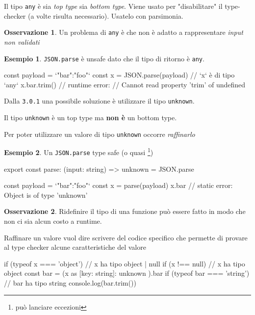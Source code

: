 \documentclass[12pt]{article}
\theoremstyle{definition}
\newtheorem{example}{Esempio}[subsection]
\newtheorem{observation}{Osservazione}[subsection]
\newenvironment{code}
  {\vspace{0.5cm} \VerbatimEnvironment\begin{typescriptcode}}
  {\end{typescriptcode} \vspace{0.2cm}}
\begin{document}
Il tipo \texttt{any} è sia \emph{top type} sia \emph{bottom type}.
Viene usato per "disabilitare" il type-checker (a volte risulta necessario).
Usatelo con parsimonia.

\begin{observation}
Un problema di \texttt{any} è che non è adatto a rappresentare \emph{input non validati}
\end{observation}

\begin{example}
\texttt{JSON.parse} è unsafe dato che il tipo di ritorno è \texttt{any}.

\begin{code}
const payload = `{"bar":"foo"}`
const x = JSON.parse(payload)
// `x` è di tipo `any`
x.bar.trim() // runtime error:
// Cannot read property 'trim' of undefined
\end{code}
\end{example}

Dalla \texttt{3.0.1} una possibile soluzione è utilizzare il tipo \texttt{unknown}.

Il tipo \texttt{unknown} è un top type ma \textbf{non è} un bottom type.

Per poter utilizzare un valore di tipo \texttt{unknown} occorre \emph{raffinarlo}

\begin{example}
Un \texttt{JSON.parse} type safe (o quasi \footnote{può lanciare eccezioni})

\begin{code}
export const parse: (input: string) => unknown = JSON.parse

const payload = `{"bar":"foo"}`
const x = parse(payload)
x.bar // static error: Object is of type 'unknown'
\end{code}
\end{example}

\begin{observation}
Ridefinire il tipo di una funzione può essere fatto in modo che non ci sia alcun costo a runtime.
\end{observation}

Raffinare un valore vuol dire scrivere del codice specifico che permette di provare al type checker alcune caratteristiche del valore

\begin{code}
if (typeof x === 'object') {
  // x ha tipo object | null
  if (x !== null) {
    // x ha tipo object
    const bar = (x as { [key: string]: unknown }).bar
    if (typeof bar === 'string') {
      // bar ha tipo string
      console.log(bar.trim())
    }
  }
}
\end{code}
\end{document}
